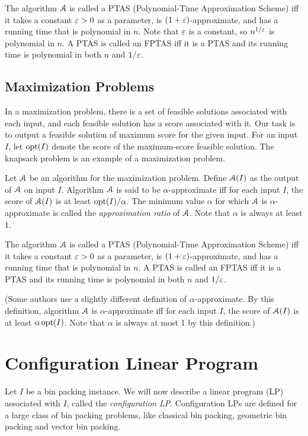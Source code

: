 The algorithm $\mathcal{A}$ is called a PTAS (Polynomial-Time Approximation Scheme)
iff it takes a constant $\varepsilon > 0$ as a parameter, is $(1+\varepsilon)$-approximate,
and has a running time that is polynomial in $n$.
Note that $\varepsilon$ is a constant, so $n^{1/\varepsilon}$ is polynomial in $n$.
A PTAS is called an FPTAS iff it is a PTAS and its running time is polynomial
in both $n$ and $1/\varepsilon$.

\subsection{Maximization Problems}
\label{sec:appx:max}

In a maximization problem, there is a set of feasible solutions associated with each input,
and each feasible solution has a score associated with it.
Our task is to output a feasible solution of maximum score for the given input.
For an input $I$, let $\operatorname{opt}(I)$ denote the score of the maximum-score feasible solution.
The knapsack problem is an example of a maximization problem.

Let $\mathcal{A}$ be an algorithm for the maximization problem.
Define $\mathcal{A}(I)$ as the output of $\mathcal{A}$ on input $I$.
Algorithm $\mathcal{A}$ is said to be $\alpha$-approximate iff
for each input $I$, the score of $\mathcal{A}(I)$ is at least $\operatorname{opt}(I)/\alpha$.
The minimum value $\alpha$ for which $\mathcal{A}$ is $\alpha$-approximate
is called the \emph{approximation ratio} of $\mathcal{A}$.
Note that $\alpha$ is always at least 1.

The algorithm $\mathcal{A}$ is called a PTAS (Polynomial-Time Approximation Scheme)
iff it takes a constant $\varepsilon > 0$ as a parameter, is $(1+\varepsilon)$-approximate,
and has a running time that is polynomial in $n$.
A PTAS is called an FPTAS iff it is a PTAS and its running time is polynomial
in both $n$ and $1/\varepsilon$.

(Some authors use a slightly different definition of $\alpha$-approximate.
By this definition, algorithm $\mathcal{A}$ is $\alpha$-approximate iff
for each input $I$, the score of $\mathcal{A}(I)$ is at least $\alpha\operatorname{opt}(I)$.
Note that $\alpha$ is always at most 1 by this definition.)

\section{Configuration Linear Program}
\label{sec:config-lp}

Let $I$ be a bin packing instance.
We will now describe a linear program (LP) associated with $I$,
called the \emph{configuration LP}.
Configuration LPs are defined for a large class of bin packing problems,
like classical bin packing, geometric bin packing and vector bin packing.

